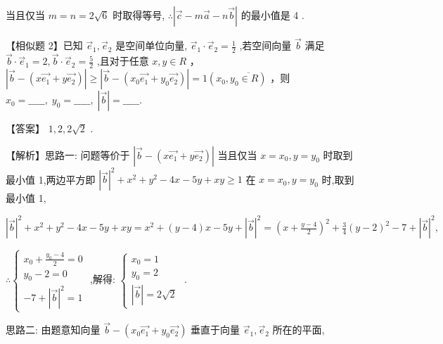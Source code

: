 \documentclass[10pt]{article}
\begin{document}
当且仅当 \(m = n = 2\sqrt{6}\) 时取得等号, \(\therefore \left| {\overrightarrow{c} - m\overrightarrow{a} - n\overrightarrow{b}}\right|\) 的最小值是 4 .

【相似题 2】已知 \({\overrightarrow{e}}_{1},{\overrightarrow{e}}_{2}\) 是空间单位向量, \({\overrightarrow{e}}_{1} \cdot  {\overrightarrow{e}}_{2} = \frac{1}{2}\) ,若空间向量 \(\overrightarrow{b}\) 满足 \(\overrightarrow{b} \cdot  {\overrightarrow{e}}_{1} = 2,\overrightarrow{b} \cdot  {\overrightarrow{e}}_{2} = \frac{5}{2}\) ,且对于任意 \(x,y \in  R\) ， \(\left| {\overrightarrow{b} - \left( {x\overrightarrow{{e}_{1}} + y\overrightarrow{{e}_{2}}}\right) }\right|  \geq  \left| {\overrightarrow{b} - \left( {{x}_{0}\overrightarrow{{e}_{1}} + {y}_{0}\overrightarrow{{e}_{2}}}\right) }\right|  = 1\left( {{x}_{0},{y}_{0}\overline{ \in  R}}\right)\) ，则 \({x}_{0} =\_\_\_\_\_,\;{y}_{0} =\_\_\_\_\_,\;\left| \overrightarrow{b}\right|  =\_\_\_\_\_.\)

【答案】 \(1,2,2\sqrt{2}\) .

【解析】思路一: 问题等价于 \(\left| {\overrightarrow{b} - \left( {x\overrightarrow{{e}_{1}} + y\overrightarrow{{e}_{2}}}\right) }\right|\) 当且仅当 \(x = {x}_{0},y = {y}_{0}\) 时取到最小值 1,两边平方即 \({\left| \overrightarrow{b}\right| }^{2} + {x}^{2} + {y}^{2} - {4x} - {5y} + {xy} \geq  1\) 在 \(x = {x}_{0},y = {y}_{0}\) 时,取到最小值 1,

\({\left| \overrightarrow{b}\right| }^{2} + {x}^{2} + {y}^{2} - {4x} - {5y} + {xy} = {x}^{2} + \left( {y - 4}\right) x - {5y} + {\left| \overrightarrow{b}\right| }^{2} = {\left( x + \frac{y - 4}{2}\right) }^{2} + \frac{3}{4}{\left( y - 2\right) }^{2} - 7 + {\left| \overrightarrow{b}\right| }^{2},\)

\(\therefore \left\{  \begin{array}{l} {x}_{0} + \frac{{y}_{0} - 4}{2} = 0 \\  {y}_{0} - 2 = 0 \\   - 7 + {\left| \overrightarrow{b}\right| }^{2} = 1 \end{array}\right.\) ,解得: \(\left\{  \begin{array}{l} {x}_{0} = 1 \\  {y}_{0} = 2 \\  \left| \overrightarrow{b}\right|  = 2\sqrt{2} \end{array}\right.\) .

思路二: 由题意知向量 \(\overrightarrow{b} - \left( {{x}_{0}\overrightarrow{{e}_{1}} + {y}_{0}\overrightarrow{{e}_{2}}}\right)\) 垂直于向量 \({\overrightarrow{e}}_{1},{\overrightarrow{e}}_{2}\) 所在的平面,
\end{document}
